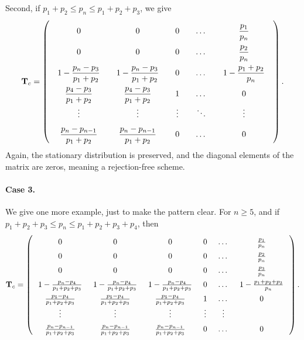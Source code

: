 \documentclass[12pt]{article}
\begin{document}
Second, if $p_1 + p_2 \le p_n \le p_1 + p_2 + p_3$,
we give
$$
  \mathbf T_{c}
=
\left(
  \arraycolsep=10.0pt\def\arraystretch{2.0}
  \begin{array}{cccccc}
    0     &   0   &   0   &   \dots  &   \dfrac{p_1}{p_n}       \\
    0     &   0   &   0   &   \dots  &   \dfrac{p_2}{p_n} \\
    1 - \dfrac{p_n - p_3}{p_1 + p_2}  &   1 - \dfrac{p_n - p_3}{p_1 + p_2}  &   0   &   \dots  &   1 - \dfrac{p_1+p_2}{p_n} \\
    \dfrac{p_4 - p_3}{p_1 + p_2}     &  \dfrac{p_4 - p_3}{p_1 + p_2}   &   1   &   \dots  &   0 \\
    \vdots&\vdots &\vdots &   \ddots &   \vdots \\
    \dfrac{p_n - p_{n-1}}{p_1 + p_2} &  \dfrac{p_n - p_{n-1}}{p_1 + p_2} &   0   &   \dots  &   0 \\
  \end{array}
\right).
$$
Again, the stationary distribution is preserved,
and the diagonal elements of the matrix are zeros,
meaning a rejection-free scheme.

\paragraph{Case 3.}

We give one more example, just to make the pattern clear.
%
For $n \ge 5$, and
if $p_1 + p_2 + p_3 \le p_n \le p_1 + p_2 + p_3 + p_4$,
then
$$
  \mathbf T_{c}
=
\left(
  \arraycolsep=7.0pt\def\arraystretch{1.5}
  \begin{array}{cccccccc}
    0     &   0   &   0   &   0 & \dots  &   \frac{p_1}{p_n}       \\
    0     &   0   &   0   &   0 & \dots  &   \frac{p_2}{p_n} \\
    0     &   0   &   0   &   0 & \dots  &   \frac{p_3}{p_n} \\
    1 - \frac{p_n - p_4}{p_1 + p_2 + p_3}  &
    1 - \frac{p_n - p_4}{p_1 + p_2 + p_3}  &
    1 - \frac{p_n - p_4}{p_1 + p_2 + p_3}  & 0   &   \dots  &   1 - \frac{p_1+p_2 + p_3}{p_n} \\
    \frac{p_5 - p_4}{p_1 + p_2 + p_3}   &
    \frac{p_5 - p_4}{p_1 + p_2 + p_3}   &
    \frac{p_5 - p_4}{p_1 + p_2 + p_3}   &
    1   &   \dots  &   0 \\
    \vdots&\vdots &\vdots & \vdots  &   \vdots \\
    \frac{p_n - p_{n-1}}{p_1 + p_2 + p_3} &
    \frac{p_n - p_{n-1}}{p_1 + p_2 + p_3} &
    \frac{p_n - p_{n-1}}{p_1 + p_2 + p_3} &
    0   &   \dots  &   0 \\
  \end{array}
\right).
$$
\end{document}
